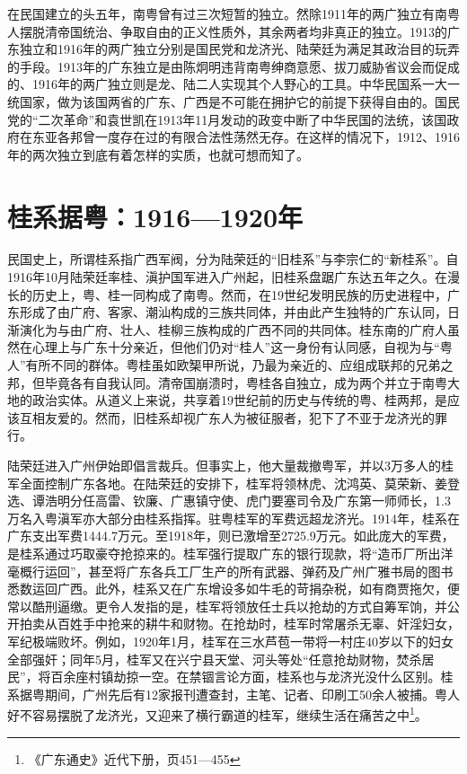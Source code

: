 在民国建立的头五年，南粤曾有过三次短暂的独立。然除1911年的两广独立有南粤人摆脱清帝国统治、争取自由的正义性质外，其余两者均非真正的独立。1913的广东独立和1916年的两广独立分别是国民党和龙济光、陆荣廷为满足其政治目的玩弄的手段。1913年的广东独立是由陈炯明违背南粤绅商意愿、拔刀威胁省议会而促成的、1916年的两广独立则是龙、陆二人实现其个人野心的工具。中华民国系一大一统国家，做为该国两省的广东、广西是不可能在拥护它的前提下获得自由的。国民党的“二次革命”和袁世凯在1913年11月发动的政变中断了中华民国的法统，该国政府在东亚各邦曾一度存在过的有限合法性荡然无存。在这样的情况下，1912、1916年的两次独立到底有着怎样的实质，也就可想而知了。

\section{桂系据粤：1916—1920年}

\indent 民国史上，所谓桂系指广西军阀，分为陆荣廷的“旧桂系”与李宗仁的“新桂系”。自1916年10月陆荣廷率桂、滇护国军进入广州起，旧桂系盘踞广东达五年之久。在漫长的历史上，粤、桂一同构成了南粤。然而，在19世纪发明民族的历史进程中，广东形成了由广府、客家、潮汕构成的三族共同体，并由此产生独特的广东认同，日渐演化为与由广府、壮人、桂柳三族构成的广西不同的共同体。桂东南的广府人虽然在心理上与广东十分亲近，但他们仍对“桂人”这一身份有认同感，自视为与“粤人”有所不同的群体。粤桂虽如欧榘甲所说，乃最为亲近的、应组成联邦的兄弟之邦，但毕竟各有自我认同。清帝国崩溃时，粤桂各自独立，成为两个并立于南粤大地的政治实体。从道义上来说，共享着19世纪前的历史与传统的粤、桂两邦，是应该互相友爱的。然而，旧桂系却视广东人为被征服者，犯下了不亚于龙济光的罪行。

陆荣廷进入广州伊始即倡言裁兵。但事实上，他大量裁撤粤军，并以3万多人的桂军全面控制广东各地。在陆荣廷的安排下，桂军将领林虎、沈鸿英、莫荣新、姜登选、谭浩明分任高雷、钦廉、广惠镇守使、虎门要塞司令及广东第一师师长，1.3万名入粤滇军亦大部分由桂系指挥。驻粤桂军的军费远超龙济光。1914年，桂系在广东支出军费1444.7万元。至1918年，则已激增至2725.9万元。如此庞大的军费，是桂系通过巧取豪夺抢掠来的。桂军强行提取广东的银行现款，将“造币厂所出洋毫概行运回”，甚至将广东各兵工厂生产的所有武器、弹药及广州广雅书局的图书悉数运回广西。此外，桂系又在广东增设多如牛毛的苛捐杂税，如有商贾拖欠，便常以酷刑逼缴。更令人发指的是，桂军将领放任士兵以抢劫的方式自筹军饷，并公开拍卖从百姓手中抢来的耕牛和财物。在抢劫时，桂军时常屠杀无辜、奸淫妇女，军纪极端败坏。例如，1920年1月，桂军在三水芦苞一带将一村庄40岁以下的妇女全部强奸；同年5月，桂军又在兴宁县天堂、河头等处“任意抢劫财物，焚杀居民”，将百余座村镇劫掠一空。在禁锢言论方面，桂系也与龙济光没什么区别。桂系据粤期间，广州先后有12家报刊遭查封，主笔、记者、印刷工50余人被捕。粤人好不容易摆脱了龙济光，又迎来了横行霸道的桂军，继续生活在痛苦之中\footnote{《广东通史》近代下册，页451—455}。

